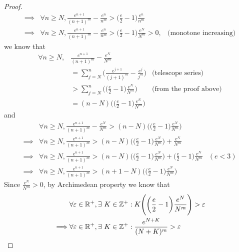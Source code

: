 \begin{proof}
\begin{align*}
    \implies & \forall n \geq N, \frac{e^{n + 1}}{(n + 1)^m} - \frac{e^n}{n^m} > \bigg(\frac{e}{2} - 1\bigg) \frac{e^n}{n^m}                                     \\
    \implies & \forall n \geq N, \frac{e^{n + 1}}{(n + 1)^m} - \frac{e^n}{n^m} > \bigg(\frac{e}{2} - 1\bigg) \frac{e^N}{N^m} > 0, & \text{(monotone increasing)}
  \end{align*}
  we know that
  \begin{align*}
    \forall n \geq N, & \frac{e^{n + 1}}{(n + 1)^m} - \frac{e^N}{N^m}                                                              \\
                      & = \sum_{j = N}^n \bigg(\frac{e^{j + 1}}{(j + 1)^m} - \frac{e^j}{j^m}\bigg) & \text{(telescope series)}     \\
                      & > \sum_{j = N}^n \Bigg(\bigg(\frac{e}{2} - 1\bigg) \frac{e^N}{N^m}\Bigg)   & \text{(from the proof above)} \\
                      & = (n - N) \Bigg(\bigg(\frac{e}{2} - 1\bigg) \frac{e^N}{N^m}\Bigg)
  \end{align*}
  and
  \begin{align*}
             & \forall n \geq N, \frac{e^{n + 1}}{(n + 1)^m} - \frac{e^N}{N^m} > (n - N) \Bigg(\bigg(\frac{e}{2} - 1\bigg) \frac{e^N}{N^m}\Bigg)                                       \\
    \implies & \forall n \geq N, \frac{e^{n + 1}}{(n + 1)^m} > (n - N) \Bigg(\bigg(\frac{e}{2} - 1\bigg) \frac{e^N}{N^m}\Bigg) + \frac{e^N}{N^m}                                       \\
    \implies & \forall n \geq N, \frac{e^{n + 1}}{(n + 1)^m} > (n - N) \Bigg(\bigg(\frac{e}{2} - 1\bigg) \frac{e^N}{N^m}\Bigg) + \bigg(\frac{e}{2} - 1\bigg) \frac{e^N}{N^m} & (e < 3) \\
    \implies & \forall n \geq N, \frac{e^{n + 1}}{(n + 1)^m} > (n + 1 - N) \Bigg(\bigg(\frac{e}{2} - 1\bigg) \frac{e^N}{N^m}\Bigg)
  \end{align*}
  Since \(\frac{e^N}{N^m} > 0\), by Archimedean property we know that
  \begin{align*}
             & \forall \varepsilon \in \R^+, \exists\ K \in \Z^+ : K \Bigg(\bigg(\frac{e}{2} - 1\bigg) \frac{e^N}{N^m}\Bigg) > \varepsilon                                \\
    \implies & \forall \varepsilon \in \R^+, \exists\ K \in \Z^+ : \frac{e^{N + K}}{(N + K)^m} > \varepsilon                                                              \\

\end{align*}
\end{proof}
